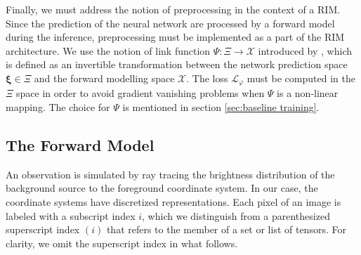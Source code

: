 \documentclass[twocolumn]{aastex631}
\begin{document}
Finally, we must address the notion of preprocessing in the context of a RIM. Since the 
prediction of the neural network are processed by a forward model during the inference, 
preprocessing must be implemented as a part of the RIM architecture. We use the notion 
of link function $\Psi: \Xi \rightarrow \mathcal{X}$ 
introduced by \citet{Putzky2017}, which is defined as an invertible transformation 
between the network prediction space $\boldsymbol{\xi} \in \Xi$ 
and the forward modelling space $\mathcal{X}$. The 
loss $\mathcal{L}_\varphi$ must be computed in the $\Xi$ space in order 
to avoid gradient vanishing problems when $\Psi$ is a non-linear mapping.
The choice for $\Psi$ is mentioned in section \ref{sec:baseline training}.




\subsection{The Forward Model}\label{sec:forward model}

An observation is simulated by ray tracing the brightness distribution 
of the background source to the foreground coordinate system. 
In our case, the coordinate systems have discretized representations.
Each pixel of an image is labeled with a subscript index $i$, which 
we distinguish from a parenthesized superscript index $(i)$ that refers to 
the member of a set or list of tensors. For clarity, we omit 
the superscript index in what follows.
\end{document}
